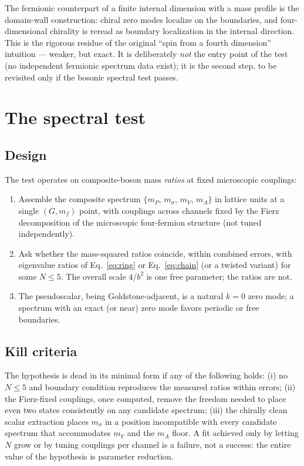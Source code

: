 \documentclass[11pt,a4paper]{article}
\begin{document}
The fermionic counterpart of a finite internal dimension with a
mass profile is the domain-wall construction: chiral zero modes
localize on the boundaries, and four-dimensional chirality is
reread as boundary localization in the internal direction.
This is the rigorous residue of the original ``spin from a fourth
dimension'' intuition --- weaker, but exact.
It is deliberately \emph{not} the entry point of the test
(no independent fermionic spectrum data exist); it is the second
step, to be revisited only if the bosonic spectral test passes.

\section{The spectral test}
\label{sec:test}

\subsection{Design}

The test operates on composite-boson mass \emph{ratios} at fixed
microscopic couplings:
\begin{enumerate}
\item Assemble the composite spectrum
$\{m_P,\, m_\sigma,\, m_V,\, m_A\}$ in lattice units at a single
$(G, m_f)$ point, with couplings across channels fixed by the
Fierz decomposition of the microscopic four-fermion structure
(not tuned independently).
\item Ask whether the mass-squared ratios coincide, within
combined errors, with eigenvalue ratios of
Eq.~\eqref{eq:ring} or Eq.~\eqref{eq:chain} (or a twisted variant)
for some $N \le 5$.
The overall scale $4/b^2$ is one free parameter; the ratios are
not.
\item The pseudoscalar, being Goldstone-adjacent, is a natural
$k=0$ zero mode; a spectrum with an exact (or near) zero mode
favors periodic or free boundaries.
\end{enumerate}

\subsection{Kill criteria}

The hypothesis is dead in its minimal form if any of the
following holds:
(i) no $N \le 5$ and boundary condition reproduces the measured
ratios within errors;
(ii) the Fierz-fixed couplings, once computed, remove the freedom
needed to place even two states consistently on any candidate
spectrum;
(iii) the chirally clean scalar extraction places $m_\sigma$ in a
position incompatible with every candidate spectrum that
accommodates $m_V$ and the $m_A$ floor.
A fit achieved only by letting $N$ grow or by tuning couplings
per channel is a failure, not a success: the entire value of the
hypothesis is parameter reduction.
\end{document}

